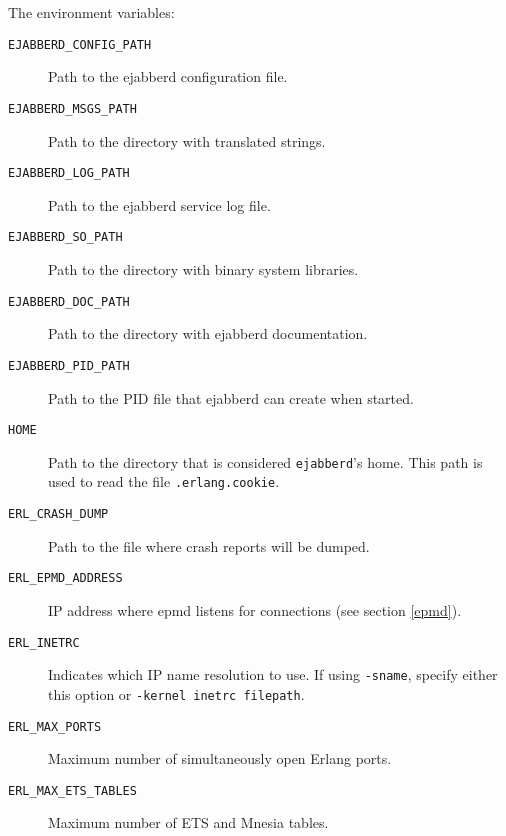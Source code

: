 \documentclass[a4paper,10pt]{book}
\newcommand{\bracehack}{\def\{{\char"7B}\def\}{\char"7D}}
\newcommand{\titem}[1]{\item[\bracehack\texttt{#1}]}
\newcommand{\term}[1]{\texttt{#1}}
\newcommand{\ejabberd}{\texttt{ejabberd}}
\begin{document}
The environment variables:
\begin{description}
  \titem{EJABBERD\_CONFIG\_PATH}
	Path to the ejabberd configuration file.
  \titem{EJABBERD\_MSGS\_PATH}
	Path to the directory with translated strings.
  \titem{EJABBERD\_LOG\_PATH}
	Path to the ejabberd service log file.
  \titem{EJABBERD\_SO\_PATH}
	Path to the directory with binary system libraries.
  \titem{EJABBERD\_DOC\_PATH}
	Path to the directory with ejabberd documentation.
  \titem{EJABBERD\_PID\_PATH}
	Path to the PID file that ejabberd can create when started.
  \titem{HOME}
	Path to the directory that is considered \ejabberd{}'s home.
	This path is used to read the file \term{.erlang.cookie}.
  \titem{ERL\_CRASH\_DUMP}
	Path to the file where crash reports will be dumped.
  \titem{ERL\_EPMD\_ADDRESS}
	IP address where epmd listens for connections (see section \ref{epmd}).
  \titem{ERL\_INETRC}
	Indicates which IP name resolution to use.
	If using \term{-sname}, specify either this option or \term{-kernel inetrc filepath}.
  \titem{ERL\_MAX\_PORTS}
	Maximum number of simultaneously open Erlang ports.
  \titem{ERL\_MAX\_ETS\_TABLES}
	Maximum number of ETS and Mnesia tables.
\end{description}
\end{document}
